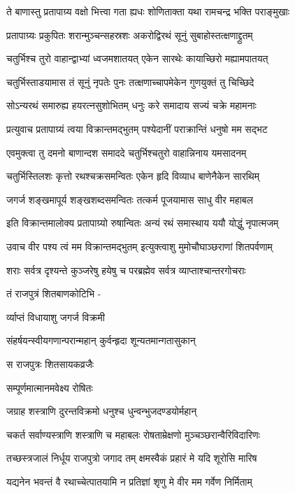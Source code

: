 \twolineshloka
{ते बाणास्तु प्रतापाग्र्य वक्षो भित्त्वा गता ह्यधः}
{शोणिताक्ता यथा रामचन्द्र भक्ति पराङ्मुखाः}%

\twolineshloka
{प्रतापाग्र्यः प्रकुपितः शरान्मुञ्चन्सहस्रशः}
{अकरोद्विरथं सूनुं सुबाहोस्तत्क्षणाद्द्रुतम्}%

\twolineshloka
{चतुर्भिश्च तुरो वाहान्द्वाभ्यां ध्वजमशातयत्}
{एकेन सारथेः कायाच्छिरो मह्यामपातयत्}%

\twolineshloka
{चतुर्भिस्ताडयामास तं सूनुं नृपतेः पुनः}
{तत्क्षणाच्चापमेकेन गुणयुक्तं तु चिच्छिदे}%

\twolineshloka
{सोऽन्यरथं समारुह्य हयरत्नसुशोभितम्}
{धनुः करे समादाय सज्यं चक्रे महामनाः}%

\twolineshloka
{प्रत्युवाच प्रतापाग्र्यं त्वया विक्रान्तमद्भुतम्}
{पश्येदानीं पराक्रान्तिं धनुषो मम सद्भट}%

\twolineshloka
{एवमुक्त्वा तु दमनो बाणान्दश समाददे}
{चतुर्भिश्चतुरो वाहान्निनाय यमसादनम्}%

\twolineshloka
{चतुर्भिस्तिलशः कृत्तो रथश्चक्रसमन्वितः}
{एकेन हृदि विव्याध बाणेनैकेन सारथिम्}%

\twolineshloka
{जगर्ज शङ्खमापूर्य शङ्खशब्दसमन्वितः}
{तत्कर्म पूजयामास साधु वीर महाबल}%

\twolineshloka
{इति विक्रान्तमालोक्य प्रतापाग्र्यो रुषान्वितः}
{अन्यं रथं समास्थाय ययौ योद्धुं नृपात्मजम्}%

\twolineshloka
{उवाच वीर पश्य त्वं मम विक्रान्तमद्भुतम्}
{इत्युक्त्वाशु मुमोचौघाञ्छराणां शितपर्वणाम्}%

\twolineshloka
{शराः सर्वत्र दृश्यन्ते कुञ्जरेषु हयेषु च}
{परब्रह्मेव सर्वत्र व्याप्ताश्चान्तरगोचराः}%

तं राजपुत्रं शितबाणकोटिभि -

र्व्याप्तं विधायाशु जगर्ज विक्रमी

\twolineshloka
{संहर्षयन्स्वीयगणान्परान्महान्}
{कुर्वन्हृदा शून्यतमान्गतासुकान्}%

स राजपुत्रः शितसायकव्रजैः

सम्पूर्णमात्मानमवेक्ष्य रोषितः

\twolineshloka
{जग्राह शस्त्राणि दुरन्तविक्रमो}
{धनुश्च धुन्वन्भुजदण्डयोर्महान्}%

\twolineshloka
{चकर्त सर्वाण्यस्त्राणि शस्त्राणि च महाबलः}
{रोषताम्रेक्षणो मुञ्चञ्छरान्वैरिविदारिणः}%

\twolineshloka
{तच्छस्त्रजालं निर्धूय राजपुत्रो जगाद तम्}
{क्षमस्वैकं प्रहारं मे यदि शूरोसि मारिष}%

\twolineshloka
{यद्यनेन भवन्तं वै रथाच्चेत्पातयामि न}
{प्रतिज्ञां शृणु मे वीर मम गर्वेण निर्मिताम्}%

